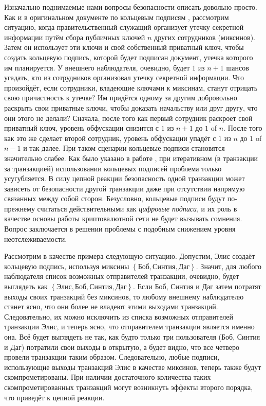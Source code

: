 \documentclass{mrl}
\begin{document}
Изначально поднимаемые нами вопросы безопасности описать довольно просто. Как и в оригинальном документе по кольцевым подписям \cite{rivest2001leak}, рассмотрим ситуацию, когда правительственный служащий организует утечку секретной информации путём сбора публичных ключей $n$ других сотрудников (миксинов). Затем он использует эти ключи и свой собственный приватный ключ, чтобы создать кольцевую подпись, которой будет подписан документ, утечка которого им планируется. У внешнего наблюдателя, очевидно, будет $1$ из $n+1$ шансов угадать, кто из сотрудников организовал утечку секретной информации. Что произойдёт, если сотрудники, владеющие ключами к миксинам, станут отрицать свою причастность к утечке? Им придётся одному за другим добровольно раскрыть свои приватные ключи, чтобы доказать начальству или друг другу, что они этого не делали? Сначала, после того как первый сотрудник раскроет свой приватный ключ, уровень обфускации снизится с $1$ из $n+1$ до $1$ of $n$. После того как это же сделает второй сотрудник, уровень обфускации упадёт с $1$ из $n$ до $1$ of $n-1$ и так далее. При таком сценарии кольцевые подписи становятся значительно слабее. Как было указано в работе \cite{chainReactions}, при итеративном (в транзакции за транзакцией) использовании кольцевых подписей проблема только усугубляется. В силу цепной реакции безопасность одной транзакции может зависеть от безопасности другой транзакции даже при отсутствии напрямую связанных между собой сторон. Безусловно, кольцевые подписи будут по-прежнему считаться действительными как \textit{цифровые подписи}, и их роль в качестве основы работы криптовалютной сети не будет вызывать сомнения. Вопрос заключается в решении проблемы с подобным снижением уровня неотслеживаемости.

Рассмотрим в качестве примера следующую ситуацию. Допустим, Элис создаёт кольцевую подпись, используя миксины $\left\{\text{Боб}, \text{Синтия}, \text{Даг}\right\}$. Значит, для любого наблюдателя список возможных отправителей транзакции, очевидно, будет выглядеть как $\left\{\text{Элис}, \text{Боб}, \text{Синтия}, \text{Даг}\right\}$. Если Боб, Синтия и Даг затем потратят выходы своих транзакций без миксинов, то любому внешнему наблюдателю станет ясно, что они более не владеют этими выходами транзакций. Следовательно, их можно исключить из списка возможных отправителей транзакции Элис, и теперь ясно, что отправителем транзакции является именно она. Всё будет выглядеть не так, как будто только три пользователя (Боб, Синтия и Даг) потратили свои выходы в открытую, а будет видно, что все четверо провели транзакции таким образом. Следовательно, любые подписи, использующие выходы транзакций Элис в качестве миксинов, теперь также будут скомпрометированы. При наличии достаточного количества таких скомпрометированных транзакций могут возникнуть эффекты второго порядка, что приведёт к цепной реакции.
\end{document}
